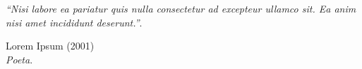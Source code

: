 
\begin{epigrafe}\vspace*{\fill}
    \begin{center}
    	\begin{flushright}\vspace*{1cm}
            \begin{minipage}{.8\textwidth}
            \begin{flushright}
            		\textit{``Nisi labore ea pariatur quis nulla consectetur ad excepteur ullamco sit. Ea anim nisi amet incididunt deserunt.''}.\\
        		\end{flushright}
        		\begin{flushright}
        		Lorem Ipsum (2001)\\
        		\textit{Poeta}.
        		\end{flushright}
            \end{minipage}
        \end{flushright}
    \end{center}
\end{epigrafe}